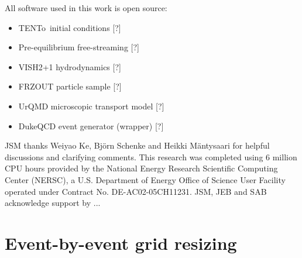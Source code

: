 \documentclass[aps,prc,reprint,amsmath,nofootinbib]{revtex4-1}
\newcommand{\trento}{T\raisebox{-0.5ex}{R}ENTo}
\newcommand{\note}{\textcolor{theblue}{[?]}}
\begin{document}
%
%
\medskip

All software used in this work is open source:
\begin{itemize}[leftmargin=2\parindent, itemsep=0pt, topsep=5pt]
  \item \trento\ initial conditions \note
  \item Pre-equilibrium free-streaming \note
  \item VISH2+1 hydrodynamics \note
  \item FRZOUT particle sample \note
  \item UrQMD microscopic transport model \note
  \item DukeQCD event generator (wrapper) \note
\end{itemize}

\begin{acknowledgments}
  JSM thanks Weiyao Ke, Bj\"orn Schenke and Heikki M\"antysaari for helpful discussions and clarifying comments.
  This research was completed using 6 million CPU hours provided by the National Energy Research Scientific Computing Center (NERSC), a U.S. Department of Energy Office of Science User Facility operated under Contract No. DE-AC02-05CH11231.
  JSM, JEB and SAB acknowledge support by ...
\end{acknowledgments}


\appendix

\section{Event-by-event grid resizing}
\label{app:adaptive_grid}
\end{document}
